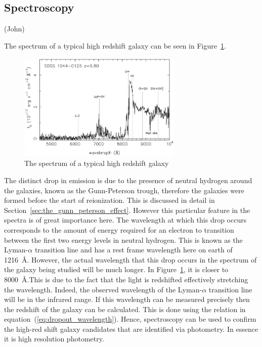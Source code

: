 \subsection{Spectroscopy} %
\label{sec:spectroscopy}
(John)

	The spectrum of a typical high redshift galaxy can be seen in Figure~\ref{fig:high_redshift_galaxy_spectrum}.
	\begin{figure}[htbp]
		\centering
			\includegraphics[width=0.7\textwidth]{../Images/high_redshift_galaxy_spec.jpg}
		\caption{\label{fig:high_redshift_galaxy_spectrum} The spectrum of a typical high redshift galaxy}
	\end{figure}

	The distinct drop in emission is due to the presence of neutral hydrogen around the galaxies, known as the Gunn-Peterson trough, therefore the galaxies were formed before the start of reionization. This is discussed in detail in Section~\ref{sec:the_gunn_peterson_effect}. However this particular feature in the spectra is of great importance here. The wavelength at which this drop occurs corresponds to the amount of energy required for an electron to transition between the first two energy levels in neutral hydrogen. This is known as the Lyman-$\alpha$ transition line and has a rest frame wavelength here on earth of \SI{1216}{\angstrom}\cite{LymanAlphaForest}\cite{TransofAtomicH}. However, the actual wavelength that this drop occurs in the spectrum of the galaxy being studied will be much longer. In Figure~\ref{fig:high_redshift_galaxy_spectrum}, it is closer to \SI{8000}{\angstrom}.This is due to the fact that the light is redshifted effectively stretching the wavelength. Indeed, the observed wavelength of the Lyman-$\alpha$ transition line will be in the infrared range. If this wavelength can be measured precisely then the redshift of the galaxy can be calculated\cite{EvidenceRion}. This is done using the relation in equation~(\ref{eq:dropout_wavelength}). Hence, spectroscopy can be used to confirm the high-red shift galaxy candidates that are identified via photometry. In essence it is high resolution photometry.

